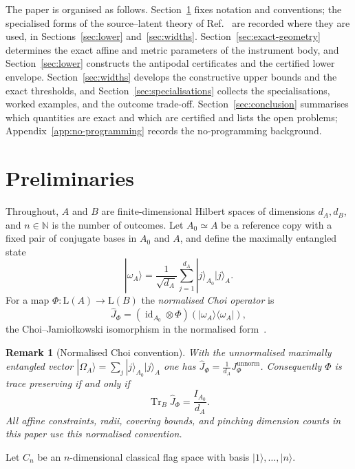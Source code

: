 \documentclass[11pt,a4paper]{article}
\newtheorem{remark}[theorem]{Remark}
\newcommand{\Lin}{\mathrm{L}}
\newcommand{\Tr}{\operatorname{Tr}}
\newcommand{\id}{\operatorname{id}}
\newcommand{\Jhat}{\widehat J}
\begin{document}
The paper is organised as follows. Section~\ref{sec:prelim} fixes notation and conventions; the specialised forms of the source--latent theory of Ref.~\cite{CompanionChannels} are recorded where they are used, in Sections~\ref{sec:lower} and~\ref{sec:widths}. Section~\ref{sec:exact-geometry} determines the exact affine and metric parameters of the instrument body, and Section~\ref{sec:lower} constructs the antipodal certificates and the certified lower envelope. Section~\ref{sec:widths} develops the constructive upper bounds and the exact thresholds, and Section~\ref{sec:specialisations} collects the specialisations, worked examples, and the outcome trade-off. Section~\ref{sec:conclusion} summarises which quantities are exact and which are certified and lists the open problems; Appendix~\ref{app:no-programming} records the no-programming background.

\section{Preliminaries}
\label{sec:prelim}

Throughout, $A$ and $B$ are finite-dimensional Hilbert spaces of dimensions $d_A,d_B$, and $n\in\mathbb N$ is the number of outcomes. Let $A_0\simeq A$ be a reference copy with a fixed pair of conjugate bases in $A_0$ and $A$, and define the maximally entangled state
\[
|\omega_A\rangle=\frac1{\sqrt{d_A}}\sum_{j=1}^{d_A}|j\rangle_{A_0}|j\rangle_A.
\]
For a map $\Phi:\Lin(A)\to\Lin(B)$ the \emph{normalised Choi operator} is
\[
\Jhat_\Phi=(\id_{A_0}\otimes\Phi)(|\omega_A\rangle\langle\omega_A|),
\]
the Choi--Jamio{\l}kowski isomorphism in the normalised form~\cite{Choi1975,Jamiolkowski1972}.

\begin{remark}[Normalised Choi convention]
\label{rem:choi-convention}
With the unnormalised maximally entangled vector $|\Omega_A\rangle=\sum_j|j\rangle_{A_0}|j\rangle_A$ one has $\Jhat_\Phi=\tfrac1{d_A}J_\Phi^{\mathrm{unnorm}}$. Consequently $\Phi$ is trace preserving if and only if
\[
\Tr_B\Jhat_\Phi=\frac{I_{A_0}}{d_A}.
\]
All affine constraints, radii, covering bounds, and pinching dimension counts in this paper use this normalised convention.
\end{remark}

Let $C_n$ be an $n$-dimensional classical flag space with basis $|1\rangle,\dots,|n\rangle$.
\end{document}
